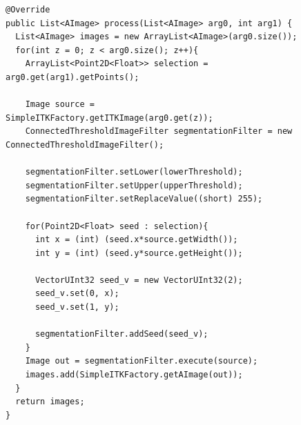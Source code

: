 \begin{figure}[htbp]
\begin{lstlisting}[frame=leftline]
@Override
public List<AImage> process(List<AImage> arg0, int arg1) {
  List<AImage> images = new ArrayList<AImage>(arg0.size());
  for(int z = 0; z < arg0.size(); z++){
    ArrayList<Point2D<Float>> selection = arg0.get(arg1).getPoints();
			
    Image source = SimpleITKFactory.getITKImage(arg0.get(z));
    ConnectedThresholdImageFilter segmentationFilter = new ConnectedThresholdImageFilter();
			
    segmentationFilter.setLower(lowerThreshold);
    segmentationFilter.setUpper(upperThreshold);
    segmentationFilter.setReplaceValue((short) 255);
			
    for(Point2D<Float> seed : selection){
      int x = (int) (seed.x*source.getWidth());
      int y = (int) (seed.y*source.getHeight());
				
      VectorUInt32 seed_v = new VectorUInt32(2);
      seed_v.set(0, x);
      seed_v.set(1, y);
				
      segmentationFilter.addSeed(seed_v);
    }
    Image out = segmentationFilter.execute(source);
    images.add(SimpleITKFactory.getAImage(out));
  }
  return images;
}
\end{lstlisting}
\end{figure}

\FloatBarrier
